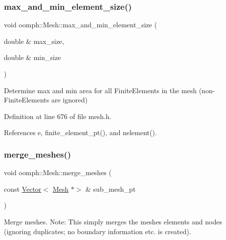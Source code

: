 \mbox{\label{classoomph_1_1Mesh_a20579c8d8f8b6e6ca2d2e897a67fda68}} 
\subsubsection{\texorpdfstring{max\+\_\+and\+\_\+min\+\_\+element\+\_\+size()}{max\_and\_min\_element\_size()}}
{\footnotesize\ttfamily void oomph\+::\+Mesh\+::max\+\_\+and\+\_\+min\+\_\+element\+\_\+size (\begin{DoxyParamCaption}\item[{double \&}]{max\+\_\+size,  }\item[{double \&}]{min\+\_\+size }\end{DoxyParamCaption})\hspace{0.3cm}{\ttfamily [inline]}}



Determine max and min area for all Finite\+Elements in the mesh (non-\/\+Finite\+Elements are ignored) 



Definition at line 676 of file mesh.\+h.



References e, finite\+\_\+element\+\_\+pt(), and nelement().

\mbox{\label{classoomph_1_1Mesh_a67decd5f62fa3177ef5228498a8db233}} 
\subsubsection{\texorpdfstring{merge\+\_\+meshes()}{merge\_meshes()}}
{\footnotesize\ttfamily void oomph\+::\+Mesh\+::merge\+\_\+meshes (\begin{DoxyParamCaption}\item[{const \hyperlink{classoomph_1_1Vector}{Vector}$<$ \hyperlink{classoomph_1_1Mesh}{Mesh} $\ast$$>$ \&}]{sub\+\_\+mesh\+\_\+pt }\end{DoxyParamCaption})}



Merge meshes. Note\+: This simply merges the meshes\textquotesingle{} elements and nodes (ignoring duplicates; no boundary information etc. is created). 

